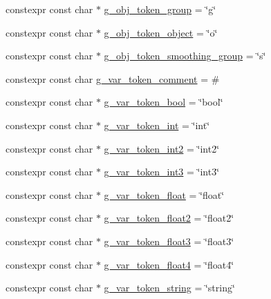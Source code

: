 \begin{DoxyCompactItemize}
constexpr const char $\ast$ \hyperlink{namespacemage_1_1loader_a4f19cb1b9eac11c37b2421d6e781dfb2}{g\+\_\+obj\+\_\+token\+\_\+group} = \char`\"{}g\char`\"{}
\item 
constexpr const char $\ast$ \hyperlink{namespacemage_1_1loader_a7a117ec0fa7a3509a663afe6ac561b22}{g\+\_\+obj\+\_\+token\+\_\+object} = \char`\"{}o\char`\"{}
\item 
constexpr const char $\ast$ \hyperlink{namespacemage_1_1loader_a43d977a9091ce35265a1b63a64421977}{g\+\_\+obj\+\_\+token\+\_\+smoothing\+\_\+group} = \char`\"{}s\char`\"{}
\item 
constexpr const char \hyperlink{namespacemage_1_1loader_a51fd34b486dfe1d203f7c7b897b2fd2c}{g\+\_\+var\+\_\+token\+\_\+comment} = \textquotesingle{}\#\textquotesingle{}
\item 
constexpr const char $\ast$ \hyperlink{namespacemage_1_1loader_af8ee37ed91ac28f044c159272c402c8f}{g\+\_\+var\+\_\+token\+\_\+bool} = \char`\"{}bool\char`\"{}
\item 
constexpr const char $\ast$ \hyperlink{namespacemage_1_1loader_a37db62978f9ca6fb022c2668ee544842}{g\+\_\+var\+\_\+token\+\_\+int} = \char`\"{}int\char`\"{}
\item 
constexpr const char $\ast$ \hyperlink{namespacemage_1_1loader_a6ef08c6dd9504fbbdb2b151decc0e93f}{g\+\_\+var\+\_\+token\+\_\+int2} = \char`\"{}int2\char`\"{}
\item 
constexpr const char $\ast$ \hyperlink{namespacemage_1_1loader_a4d46ae8b522ffdf597cbfef8ff300f36}{g\+\_\+var\+\_\+token\+\_\+int3} = \char`\"{}int3\char`\"{}
\item 
constexpr const char $\ast$ \hyperlink{namespacemage_1_1loader_a3732f74f1d4aec47eb9957a310d59acf}{g\+\_\+var\+\_\+token\+\_\+float} = \char`\"{}float\char`\"{}
\item 
constexpr const char $\ast$ \hyperlink{namespacemage_1_1loader_ac1ec2d32ca513327528e23ffebb92be0}{g\+\_\+var\+\_\+token\+\_\+float2} = \char`\"{}float2\char`\"{}
\item 
constexpr const char $\ast$ \hyperlink{namespacemage_1_1loader_a70b076251ea234128736d1a8c6761d4c}{g\+\_\+var\+\_\+token\+\_\+float3} = \char`\"{}float3\char`\"{}
\item 
constexpr const char $\ast$ \hyperlink{namespacemage_1_1loader_aaf283d156cc079b16c1b5821c2078c78}{g\+\_\+var\+\_\+token\+\_\+float4} = \char`\"{}float4\char`\"{}
\item 
constexpr const char $\ast$ \hyperlink{namespacemage_1_1loader_adec72619d7286e73229e6f1049cc7195}{g\+\_\+var\+\_\+token\+\_\+string} = \char`\"{}string\char`\"{}
\end{DoxyCompactItemize}


